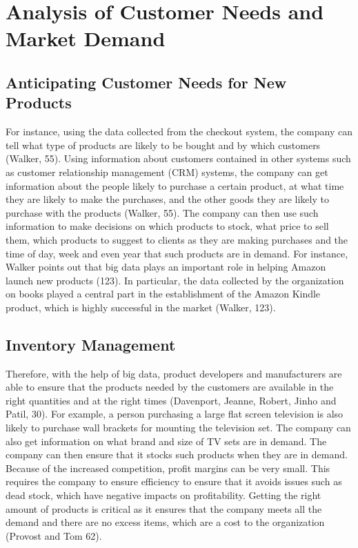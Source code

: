\documentclass[sigconf]{acmart}
\begin{document}
\section{Analysis of Customer Needs and Market Demand}
\subsection{Anticipating Customer Needs for New Products}
For instance, using the data collected from the checkout system, the company can tell what type of products are likely to be bought and by which customers (Walker, 55). Using information about customers contained in other systems such as customer relationship management (CRM) systems, the company can get information about the people likely to purchase a certain product, at what time they are likely to make the purchases, and the other goods they are likely to purchase with the products (Walker, 55). The company can then use such information to make decisions on which products to stock, what price to sell them, which products to suggest to clients as they are making purchases and the time of day, week and even year that such products are in demand. For instance, Walker points out that big data plays an important role in helping Amazon launch new products (123). In particular, the data collected by the organization on books played a central part in the establishment of the Amazon Kindle product, which is highly successful in the market (Walker, 123).
\subsection{Inventory Management}
Therefore, with the help of big data, product developers and manufacturers are able to ensure that the products needed by the customers are available in the right quantities and at the right times (Davenport, Jeanne, Robert, Jinho and Patil, 30). For example, a person purchasing a large flat screen television is also likely to purchase wall brackets for mounting the television set. The company can also get information on what brand and size of TV sets are in demand. The company can then ensure that it stocks such products when they are in demand. Because of the increased competition, profit margins can be very small. This requires the company to ensure efficiency to ensure that it avoids issues such as dead stock, which have negative impacts on profitability. Getting the right amount of products is critical as it ensures that the company meets all the demand and there are no excess items, which are a cost to the organization (Provost and Tom 62). 
\end{document}
